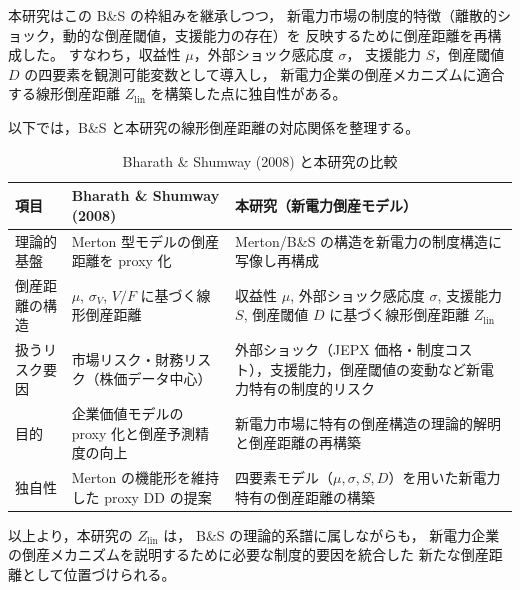 本研究はこの B\&S の枠組みを継承しつつ，
新電力市場の制度的特徴（離散的ショック，動的な倒産閾値，支援能力の存在）を
反映するために倒産距離を再構成した。
すなわち，収益性 $\mu$，外部ショック感応度 $\sigma$，
支援能力 $S$，倒産閾値 $D$ の四要素を観測可能変数として導入し，
新電力企業の倒産メカニズムに適合する線形倒産距離
$Z_{\text{lin}}$ を構築した点に独自性がある。

以下では，B\&S と本研究の線形倒産距離の対応関係を整理する。

\begin{table}[H]
\centering
\caption{Bharath \& Shumway (2008) と本研究の比較}
\label{tab:bs_vs_this}

\renewcommand{\arraystretch}{1.4}
\begin{tabularx}{\textwidth}{p{} p{} X}
\toprule
\textbf{項目} & \textbf{Bharath \& Shumway (2008)} & \textbf{本研究（新電力倒産モデル）} \\
\midrule

理論的基盤 &
Merton 型モデルの倒産距離を proxy 化 &
Merton/B\&S の構造を新電力の制度構造に写像し再構成 \\

倒産距離の構造 &
$\mu$, $\sigma_V$, $V/F$ に基づく線形倒産距離 &
収益性 $\mu$, 外部ショック感応度 $\sigma$, 支援能力 $S$, 倒産閾値 $D$ に基づく線形倒産距離 $Z_{\text{lin}}$ \\

扱うリスク要因 &
市場リスク・財務リスク（株価データ中心） &
外部ショック（JEPX 価格・制度コスト），支援能力，倒産閾値の変動など新電力特有の制度的リスク \\

目的 &
企業価値モデルの proxy 化と倒産予測精度の向上 &
新電力市場に特有の倒産構造の理論的解明と倒産距離の再構築 \\

独自性 &
Merton の機能形を維持した proxy DD の提案 &
四要素モデル（$\mu, \sigma, S, D$）を用いた新電力特有の倒産距離の構築 \\

\bottomrule
\end{tabularx}
\end{table}

以上より，本研究の $Z_{\text{lin}}$ は，
B\&S の理論的系譜に属しながらも，
新電力企業の倒産メカニズムを説明するために必要な制度的要因を統合した
新たな倒産距離として位置づけられる。
